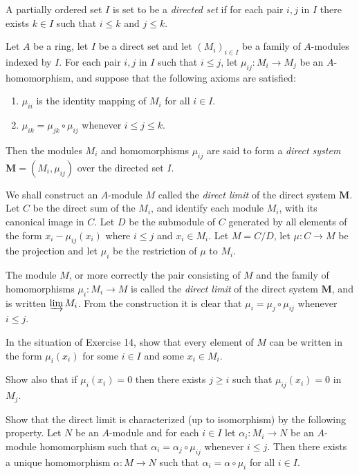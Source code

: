 
A partially ordered set $I$ is set to be a \textit{directed set} if for each pair $i, j$ in $I$ there exists $k\in I$ such that $i\leq k$ and $j\leq k$.

Let $A$ be a ring, let $I$ be a direct set and let $(M_i)_{i\in I}$ be a family of $A$-modules indexed by $I$. For each pair $i, j$ in $I$ such that $i\leq j$, let $\mu_{ij}:M_i\to M_j$ be an $A$-homomorphism, and suppose that the following axioms are satisfied:

\begin{enumerate}
    \item $\mu_{ii}$ is the identity mapping of $M_i$ for all $i\in I$.
    \item $\mu_{ik}=\mu_{jk}\circ\mu_{ij}$ whenever $i\leq j\leq k$.
\end{enumerate}

Then the modules $M_i$ and homomorphisms $\mu_{ij}$ are said to form a \textit{direct system} $\mathbf{M}=(M_i,\mu_{ij})$ over the directed set $I$.

We shall construct an $A$-module $M$ called the \textit{direct limit} of the direct system $\mathbf{M}$. Let $C$ be the direct sum of the $M_i$, and identify each module $M_i$, with its canonical image in $C$. Let $D$ be the submodule of $C$ generated by all elements of the form $x_i-\mu_{ij}(x_i)$ where $i\leq j$ and $x_i\in M_i$. Let $M = C/D$, let $\mu:C\to M$ be the projection and let $\mu_i$ be the restriction of $\mu$ to $M_i$.

The module $M$, or more correctly the pair consisting of $M$ and the family of homomorphisms $\mu_i:M_i\to M$ is called the \textit{direct limit} of the direct system $\mathbf{M}$, and is written $\varinjlim M_i$. From the construction it is clear that $\mu_i=\mu_j\circ\mu_{ij}$ whenever $i\leq j$.


In the situation of Exercise 14, show that every element of $M$ can be written in the form $\mu_i(x_i)$ for some $i\in I$ and some $x_i\in M_i$.

Show also that if $\mu_i(x_i)=0$ then there exists $j\geq i$ such that $\mu_{ij}(x_i)=0$ in $M_j$.


Show that the direct limit is characterized (up to isomorphism) by the following property. Let $N$ be an $A$-module and for each $i\in I$ let $\alpha_i :M_i\to N$ be an $A$-module homomorphism such that $\alpha_i = \alpha_j\circ\mu_{ij}$ whenever $i \leq j$. Then there exists a unique homomorphism $\alpha: M\to N$ such that $\alpha_i=\alpha\circ\mu_i$ for all $i\in I$.
